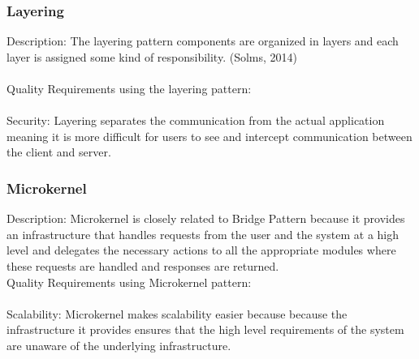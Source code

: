  \subsubsection{Layering}
 Description: The layering pattern components are organized in layers and each layer is assigned some kind of responsibility. (Solms, 2014)\\
 \\
 Quality Requirements using the layering pattern:\\
 \\
 Security: Layering separates the communication from the actual application meaning it is more difficult for users to see and intercept communication between the client and server.\\
 
\subsubsection{Microkernel}
Description: Microkernel is closely related to Bridge Pattern because it provides an infrastructure that handles requests from the user and the system at a high level and delegates the necessary actions to all the appropriate modules where these requests are handled and responses are returned.
\\
Quality Requirements using Microkernel pattern:\\
\\
Scalability: Microkernel makes scalability easier because because the infrastructure it provides ensures that the high level requirements of the system are unaware of the underlying infrastructure.\\